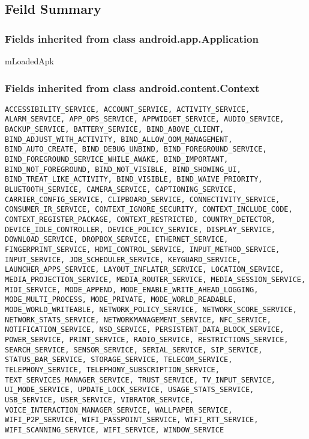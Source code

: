 \begin{DoxyCompactItemize}
\subsection{Feild Summary}

\subsubsection{Fields inherited from class android.app.Application}
mLoadedApk

\subsubsection{Fields inherited from class android.content.Context}
\begin{lstlisting}
ACCESSIBILITY_SERVICE, ACCOUNT_SERVICE, ACTIVITY_SERVICE, ALARM_SERVICE, APP_OPS_SERVICE, APPWIDGET_SERVICE, AUDIO_SERVICE, BACKUP_SERVICE, BATTERY_SERVICE, BIND_ABOVE_CLIENT, BIND_ADJUST_WITH_ACTIVITY, BIND_ALLOW_OOM_MANAGEMENT, BIND_AUTO_CREATE, BIND_DEBUG_UNBIND, BIND_FOREGROUND_SERVICE, BIND_FOREGROUND_SERVICE_WHILE_AWAKE, BIND_IMPORTANT, BIND_NOT_FOREGROUND, BIND_NOT_VISIBLE, BIND_SHOWING_UI, BIND_TREAT_LIKE_ACTIVITY, BIND_VISIBLE, BIND_WAIVE_PRIORITY, BLUETOOTH_SERVICE, CAMERA_SERVICE, CAPTIONING_SERVICE, CARRIER_CONFIG_SERVICE, CLIPBOARD_SERVICE, CONNECTIVITY_SERVICE, CONSUMER_IR_SERVICE, CONTEXT_IGNORE_SECURITY, CONTEXT_INCLUDE_CODE, CONTEXT_REGISTER_PACKAGE, CONTEXT_RESTRICTED, COUNTRY_DETECTOR, DEVICE_IDLE_CONTROLLER, DEVICE_POLICY_SERVICE, DISPLAY_SERVICE, DOWNLOAD_SERVICE, DROPBOX_SERVICE, ETHERNET_SERVICE, FINGERPRINT_SERVICE, HDMI_CONTROL_SERVICE, INPUT_METHOD_SERVICE, INPUT_SERVICE, JOB_SCHEDULER_SERVICE, KEYGUARD_SERVICE, LAUNCHER_APPS_SERVICE, LAYOUT_INFLATER_SERVICE, LOCATION_SERVICE, MEDIA_PROJECTION_SERVICE, MEDIA_ROUTER_SERVICE, MEDIA_SESSION_SERVICE, MIDI_SERVICE, MODE_APPEND, MODE_ENABLE_WRITE_AHEAD_LOGGING, MODE_MULTI_PROCESS, MODE_PRIVATE, MODE_WORLD_READABLE, MODE_WORLD_WRITEABLE, NETWORK_POLICY_SERVICE, NETWORK_SCORE_SERVICE, NETWORK_STATS_SERVICE, NETWORKMANAGEMENT_SERVICE, NFC_SERVICE, NOTIFICATION_SERVICE, NSD_SERVICE, PERSISTENT_DATA_BLOCK_SERVICE, POWER_SERVICE, PRINT_SERVICE, RADIO_SERVICE, RESTRICTIONS_SERVICE, SEARCH_SERVICE, SENSOR_SERVICE, SERIAL_SERVICE, SIP_SERVICE, STATUS_BAR_SERVICE, STORAGE_SERVICE, TELECOM_SERVICE, TELEPHONY_SERVICE, TELEPHONY_SUBSCRIPTION_SERVICE, TEXT_SERVICES_MANAGER_SERVICE, TRUST_SERVICE, TV_INPUT_SERVICE, UI_MODE_SERVICE, UPDATE_LOCK_SERVICE, USAGE_STATS_SERVICE, USB_SERVICE, USER_SERVICE, VIBRATOR_SERVICE, VOICE_INTERACTION_MANAGER_SERVICE, WALLPAPER_SERVICE, WIFI_P2P_SERVICE, WIFI_PASSPOINT_SERVICE, WIFI_RTT_SERVICE, WIFI_SCANNING_SERVICE, WIFI_SERVICE, WINDOW_SERVICE
\end{lstlisting}


\end{DoxyCompactItemize}
